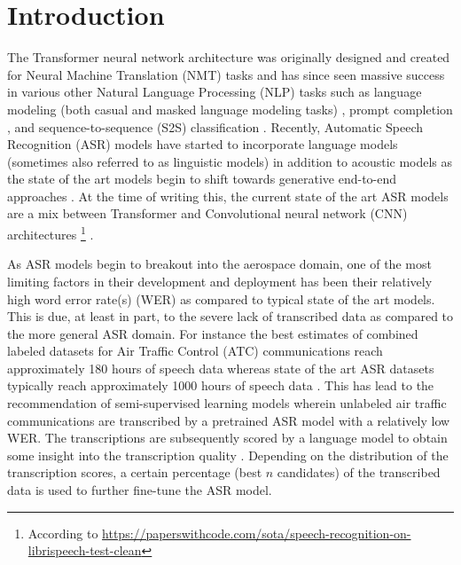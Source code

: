 \documentclass[10pt]{article}
\begin{document}
    \section{Introduction}
        The Transformer neural network architecture was originally designed and created for Neural Machine
        Translation (NMT) tasks \cite{vaswani_attention_2017} and has since seen massive success in various
        other Natural Language Processing (NLP) tasks such as language modeling (both casual and masked language
        modeling tasks) \cite{devlin_bert_2019}, prompt completion \cite{radford_improving_2018}, and
        sequence-to-sequence (S2S) classification \cite{lewis_bart_2019}.
        Recently, Automatic Speech Recognition (ASR) models have started to incorporate language models
        \cite{badrinath_automatic_2022} (sometimes also referred to as linguistic models) in addition to
        acoustic models \cite{li_jasper_2019} as the state of the art models begin to shift towards generative
        end-to-end approaches \cite{hannun_deep_2014}.
        At the time of writing this, the current state of the art ASR models are a mix between Transformer
        and Convolutional neural network (CNN) architectures
        \footnote{According to \url{https://paperswithcode.com/sota/speech-recognition-on-librispeech-test-clean}}
        \cite{baevski_wav2vec_2020}.


        As ASR models begin to breakout into the aerospace domain, one of the most limiting factors in their
        development and deployment has been their relatively high word error rate(s) (WER)
        \cite{smidl_air_2019,zuluaga-gomez_automatic_2020,badrinath_automatic_2022} as compared to typical state of the art models.
        This is due, at least in part, to the severe lack of transcribed data as compared to the more general ASR domain.
        For instance the best estimates of combined labeled datasets for Air Traffic Control (ATC)
        communications reach approximately 180 hours of speech data \cite{zuluaga-gomez_automatic_2020} whereas
        state of the art ASR datasets typically reach approximately 1000 hours of speech data \cite{panayotov_librispeech_2015}.
        This has lead to the recommendation of semi-supervised learning models wherein unlabeled air
        traffic communications are transcribed by a pretrained ASR model with a relatively low WER.
        The transcriptions are subsequently scored by a language model to obtain some insight into the
        transcription quality \cite{badrinath_automatic_2022,zuluaga-gomez_contextual_2021}.
        Depending on the distribution of the transcription scores, a certain percentage (best $n$ candidates)
        of the transcribed data is used to further fine-tune the ASR model.
\end{document}
